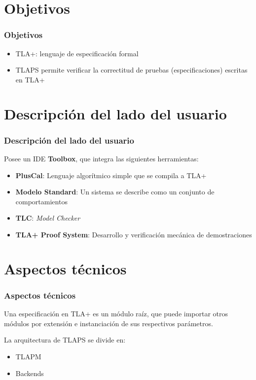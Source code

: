 \documentclass[12pt]{beamer}
\newenvironment{stepitemize}{\begin{itemize}[<+->]}{\end{itemize} }
\begin{document}
\section{Objetivos}
\begin{frame}
\frametitle{Objetivos}
\begin{stepitemize}
  \item TLA+: lenguaje de especificación formal
  \item TLAPS permite verificar la correctitud de pruebas (especificaciones) escritas en TLA+
\end{stepitemize}
\end{frame}


\section[Descripción]{Descripción del lado del usuario}
\begin{frame}
  \frametitle{Descripción del lado del usuario}
    Posee un IDE \textbf{Toolbox}, que integra las siguientes herramientas:
      \begin{stepitemize}
	\item \textbf{PlusCal}: Lenguaje algorítmico simple que se compila a TLA+
	\item \textbf{Modelo Standard}: Un sistema se describe como un conjunto de comportamientos
	\item \textbf{TLC}: \textit{Model Checker}
	\item \textbf{TLA+ Proof System}: Desarrollo y verificación mecánica de demostraciones
      \end{stepitemize}

\end{frame}


\section{Aspectos técnicos}
\begin{frame}
\frametitle{Aspectos técnicos}
  Una especificación en TLA+ es un módulo raíz, que puede importar otros módulos por extensión e instanciación de sus respectivos parámetros.
  
  La arquitectura de TLAPS se divide en:
  \begin{itemize}
    \item TLAPM
    \item Backends
  \end{itemize}

\end{frame}
\end{document}
